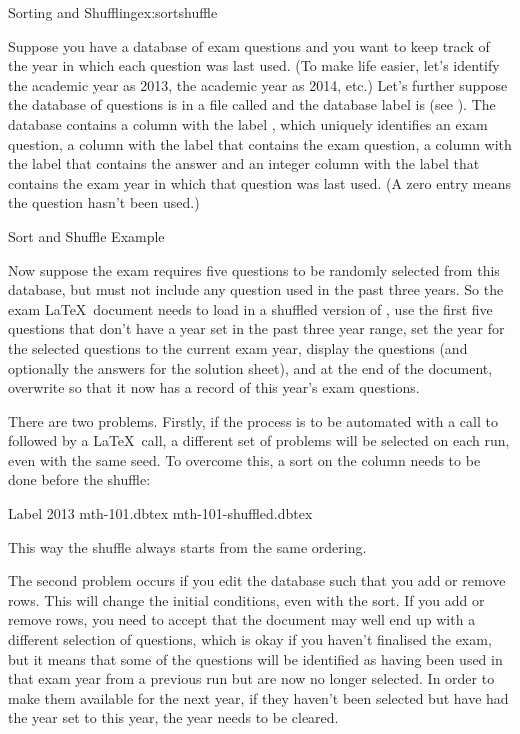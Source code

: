 \begin{example}{Sorting and Shuffling}{ex:sortshuffle}

Suppose you have a database of exam questions and you want to keep
track of the year in which each question was last used. (To make life
easier, let's identify the academic year  as 2013, the
academic year  as 2014, etc.) Let's further suppose the
database of questions is in a file called 
and the database label is  (see 
). The database 
contains a column with the label , which
uniquely identifies an exam question, a column with the label
 that contains the exam question, a column
with the label  that contains the answer and
an integer column with the label  that contains the
exam year in which that question was last used. (A zero entry means the
question hasn't been used.)

 {%
 }
 {Sort and Shuffle Example}

Now suppose the exam requires five questions to be randomly selected from 
this database, but must not include any question used in the past three 
years. So the exam \LaTeX\ document needs to load in a shuffled
version of , use the first five questions that don't
have a year set in the past three year range, set the year for the
selected questions to the current exam year, display the questions (and
optionally the answers for the solution sheet), and at the end of the
document, overwrite  so that it now has 
a record of this year's exam questions.

There are two problems. Firstly, if the process is to be automated
with a call to   followed by 
a \LaTeX\ call, a different set of problems will be selected
on each run, even with the same seed. To overcome this, a sort on 
the  column needs to be done before the shuffle:
\begin{terminal}
  Label  2013   mth-101.dbtex \continueline {} mth-101-shuffled.dbtex
\end{terminal}
\ContExplan
This way the shuffle always starts from the same ordering.

The second problem occurs if you edit the database such that you add or
remove rows. This will change the initial conditions, even with the sort.
If you add or remove rows, you need to accept that the document may well
end up with a different selection of questions, which is okay if
you haven't finalised the exam, but it means that some of the questions
will be identified as having been used in that exam year from 
a previous run but are now no longer selected. In order to make them
available for the next year, if they haven't been selected but have had the
year set to this year, the year needs to be cleared.


\end{example}
